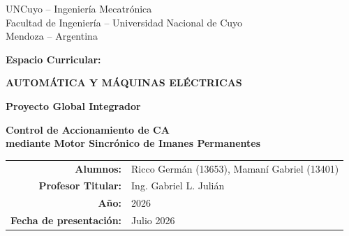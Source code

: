 \documentclass[10pt,a4paper]{article}
\newcommand{\nombreMateria}{AUTOMÁTICA Y MÁQUINAS ELÉCTRICAS}
\newcommand{\alumnos}{Ricco Germán (13653), Mamaní Gabriel (13401)}
\newcommand{\anioProyecto}{2026}
\newcommand{\fechaPresentacion}{Julio 2026}
\newcommand{\profesor}{Ing. Gabriel L. Julián}
\begin{document}
\begin{titlepage}
    \thispagestyle{empty}
    \centering

    \vspace*{0.7cm}

    {\large UNCuyo -- Ingeniería Mecatrónica\\[2pt]
    Facultad de Ingeniería -- Universidad Nacional de Cuyo\\[2pt]
    Mendoza -- Argentina}\par

    \vspace{1.1cm}

    {\Large \textbf{Espacio Curricular:}}\par
    {\Large \textbf{\nombreMateria}}\par

    \vspace{1.6cm}

    {\Huge \textbf{Proyecto Global Integrador}}\par

    \vspace{1.0cm}

    \begin{minipage}{0.92\textwidth}
        \centering
        {\LARGE\bfseries Control de Accionamiento de CA\\[6pt]
        mediante Motor Sincrónico de Imanes Permanentes\par}
    \end{minipage}

    \vfill

    \begin{tabular}{rl}
        \textbf{Alumnos:} & \alumnos \\
        \textbf{Profesor Titular:} & \profesor \\
        \textbf{Año:} & \anioProyecto \\
        \textbf{Fecha de presentación:} & \fechaPresentacion \\
    \end{tabular}

    \vspace*{0.8cm}
\end{titlepage}

\end{document}
